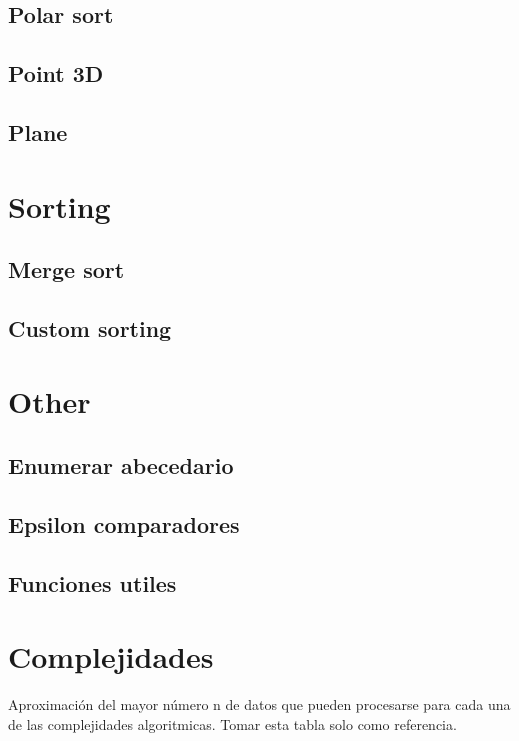 \subsection{Polar sort}
\subsection{Point 3D}
\subsection{Plane}

\section{Sorting}
\subsection{Merge sort}
\subsection{Custom sorting}

\section{Other}
\subsection{Enumerar abecedario}
\subsection{Epsilon comparadores}
\subsection{Funciones utiles}

\section{Complejidades}
Aproximación del mayor número n de datos que pueden procesarse para cada una de las complejidades algoritmicas. Tomar esta tabla solo como referencia.

